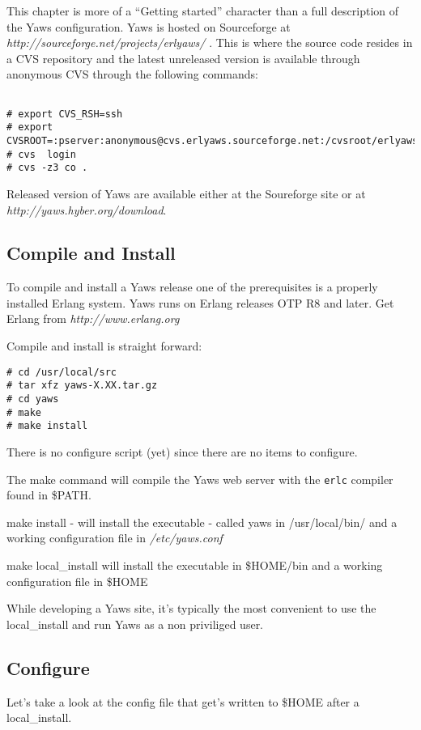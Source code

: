 \documentclass[11pt,oneside,english]{book}
\begin{document}
This chapter is more of a ``Getting started'' character than a full
description of the Yaws configuration. 
Yaws is hosted on Sourceforge at 
\textit { http://sourceforge.net/projects/erlyaws/ }. This is where the source code
resides in a CVS repository and the latest unreleased version is
available through anonymous CVS through the following commands:

\begin{verbatim}

# export CVS_RSH=ssh 
# export CVSROOT=:pserver:anonymous@cvs.erlyaws.sourceforge.net:/cvsroot/erlyaws
# cvs  login
# cvs -z3 co .

\end{verbatim}


Released version of Yaws are available either at the Soureforge site or
at \textit{http://yaws.hyber.org/download}. 



\subsection{Compile and Install}

To compile and install a Yaws release
one of the prerequisites is a properly installed Erlang system. Yaws
runs on Erlang releases OTP R8 and later. Get Erlang from
\textit{http://www.erlang.org}

Compile and install is straight forward:
\begin{verbatim}
# cd /usr/local/src
# tar xfz yaws-X.XX.tar.gz
# cd yaws
# make 
# make install
\end{verbatim}

There is no configure script (yet) since there are no items
to configure. 

The make command will compile the Yaws web server with the \verb+erlc+
compiler found in \$PATH.

make install - will install the executable - called yaws in
/usr/local/bin/ and a working configuration file in \textit{ /etc/yaws.conf}

make local\_install will install the executable in \$HOME/bin and a
working configuration file in \$HOME

While developing a Yaws site, it's typically the most convenient to
use the local\_install and run Yaws as a non priviliged user.


\subsection{Configure}
Let's take a look at the config file that get's written to \$HOME after
a local\_install.
\end{document}
